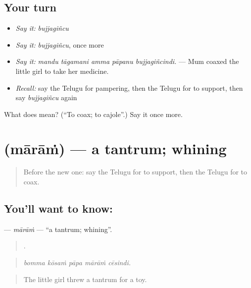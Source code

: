 \subsection*{Your turn}
\begin{itemize}
\raggedright
  \item \emph{Say it:} \emph{bujjagiñcu}
  \item \emph{Say it:} \emph{bujjagiñcu}, once more
  \item \emph{Say it:} \emph{mandu tāgamani amma pāpanu bujjagiñcindi.} — Mum coaxed the little girl to take her medicine.
  \item \emph{Recall:} say the Telugu for pampering, then the Telugu for to support, then say \emph{bujjagiñcu} again
\end{itemize}

\begin{tcolorbox}[breakable,colback=teal!4,colframe=teal!35!black,title={Before you move on}]
What does  mean? (\textquotedblleft{}To coax; to cajole\textquotedblright{}.) Say it once more.
\end{tcolorbox}
\section[\texorpdfstring{\te{మారాం} (mārāṁ)}{మారాం (mārāṁ)}]{ (mārāṁ) — a tantrum; whining}

\label{lesson:TE-C532-maram}



\begin{quote}
Before the new one: say the Telugu for to support, then the Telugu for to coax.
\end{quote}

\subsection*{You'll want to know: }
\textbf{} — \emph{mārāṁ} — \textquotedblleft{}a tantrum; whining\textquotedblright{}.

\begin{quote}
    .
\end{quote}

\begin{quote}
\emph{bomma kōsaṁ pāpa mārāṁ cēsindi.}
\end{quote}

\begin{quote}
The little girl threw a tantrum for a toy.
\end{quote}

